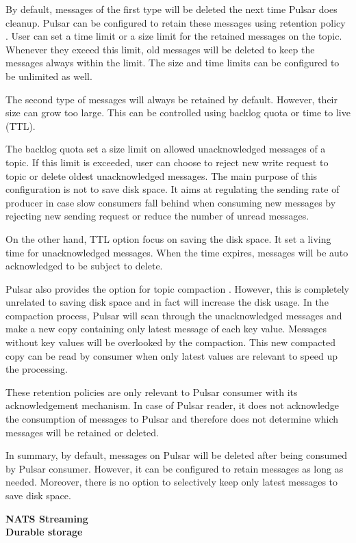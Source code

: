 By default, messages of the first type will be deleted the next time Pulsar does cleanup. Pulsar can be configured to retain these messages using retention policy \cite{pulsarretention}. User can set a time limit or a size limit for the retained messages on the topic. Whenever they exceed this limit, old messages will be deleted to keep the messages always within the limit. The size and time limits can be configured to be unlimited as well.

The second type of messages will always be retained by default. However, their size can grow too large. This can be controlled using backlog quota or time to live (TTL).

The backlog quota set a size limit on allowed unacknowledged messages of a topic. If this limit is exceeded, user can choose to reject new write request to topic or delete oldest unacknowledged messages. The main purpose of this configuration is not to save disk space. It aims at regulating the sending rate of producer in case slow consumers fall behind when consuming new messages by rejecting new sending request or reduce the number of unread messages.

On the other hand, TTL option focus on saving the disk space. It set a living time for unacknowledged messages. When the time expires, messages will be auto acknowledged to be subject to delete. 

Pulsar also provides the option for topic compaction \cite{pulsarcompact}. However, this is completely unrelated to saving disk space and in fact will increase the disk usage. In the compaction process, Pulsar will scan through the unacknowledged messages and make a new copy containing only latest message of each key value. Messages without key values will be overlooked by the compaction. This new compacted copy can be read by consumer when only latest values are relevant to speed up the processing.

These retention policies are only relevant to Pulsar consumer with its acknowledgement mechanism. In case of Pulsar reader, it does not acknowledge the consumption of messages to Pulsar and therefore does not determine which messages will be retained or deleted.

In summary, by default, messages on Pulsar will be deleted after being consumed by Pulsar consumer. However, it can be configured to retain messages as long as needed. Moreover, there is no option to selectively keep only latest messages to save disk space.

\large \textbf{NATS Streaming}\\
\normalsize
\textbf{Durable storage}

